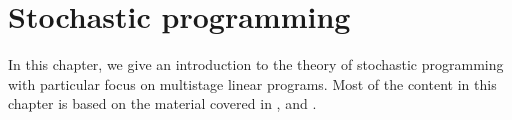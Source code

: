 \chapter{Stochastic programming}


%
%

	
In this chapter, we give an introduction to the theory of stochastic programming with particular focus on multistage linear programs. Most of the content in this chapter is based on the material covered in \cite[Chapter 1]{stochasticprogrammingbible}, \cite[Chapters 1-3]{stochasticprogrammingbible2009} and \cite[Part 2]{dupacovastochasticprogramming}.

